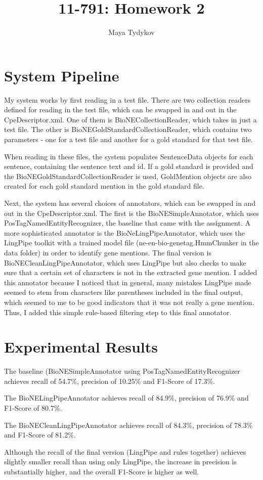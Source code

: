 \documentclass[11pt]{article}
\title{\textbf{11-791: Homework 2}}
\author{Maya Tydykov}
\date{}
\begin{document}
\maketitle

\section{System Pipeline}

My system works by first reading in a test file. There are two collection readers defined for reading in the test file, which can be swapped in and out in the CpeDescriptor.xml. One of them is BioNECollectionReader, which takes in just a test file. The other is BioNEGoldStandardCollectionReader, which contains two parameters - one for a test file and another for a gold standard for that test file. 

When reading in these files, the system populates SentenceData objects for each sentence, containing the sentence text and id. If a gold standard is provided and the BioNEGoldStandardCollectionReader is used, GoldMention objects are also created for each gold standard mention in the gold standard file.

Next, the system has several choices of annotators, which can be swapped in and out in the CpeDescriptor.xml. The first is the BioNESimpleAnnotator, which uses PosTagNamedEntityRecognizer, the baseline that came with the assignment. A more sophisticated annotator is the BioNeLingPipeAnnotator, which uses the LingPipe toolkit with a trained model file (ne-en-bio-genetag.HmmChunker in the data folder) in order to identify gene mentions. The final version is BioNECleanLingPipeAnnotator, which uses LingPipe but also checks to make sure that a certain set of characters is not in the extracted gene mention. I added this annotator because I noticed that in general, many mistakes LingPipe made seemed to stem from characters like parentheses included in the final output, which seemed to me to be good indicators that it was not really a gene mention. Thus, I added this simple rule-based filtering step to this final annotator. 

\section{Experimental Results}

The baseline (BioNESimpleAnnotator using PosTagNamedEntityRecognizer achieves recall of 54.7\%, precision of 10.25\% and F1-Score of 17.3\%.

The BioNELingPipeAnnotator achieves recall of 84.9\%, precision of 76.9\% and F1-Score of 80.7\%.

The BioNECleanLingPipeAnnotator achieves recall of 84.3\%, precision of 78.3\% and F1-Score of 81.2\%. 

Although the recall of the final version (LingPipe and rules together) achieves slightly smaller recall than using only LingPipe, the increase in precision is substantially higher, and the overall F1-Score is higher as well.
\end{document}
